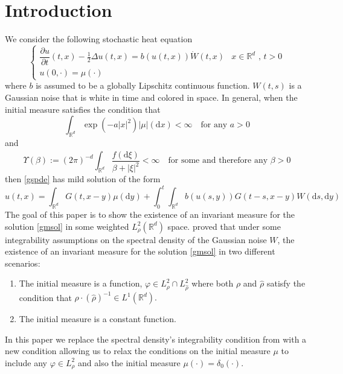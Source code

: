 \documentclass{article}
\numberwithin{equation}{section}
\newcommand{\R}{\mathbb{R}}
\newcommand{\ud}{\ensuremath{\mathrm{d}}}
\begin{document}
\section{Introduction} 
We consider the following stochastic heat equation 
\begin{equation}
\begin{cases}
\dfrac{\partial u}{\partial t}(t,x)-\frac{1}{2}\Delta u(t,x) = b(u(t,x))\dot W(t,x) & \text{$x\in \mathbb R^d$ , $t>0$}
\\ u(0,\cdot) = \mu(\cdot)  & 
\end{cases}  \label{gspde}
\end{equation} 
where $b$ is assumed to be a globally Lipschitz continuous function. $W(t,s)$  is a Gaussian noise that is white in time and colored in space. In general, when the initial measure satisfies the condition that \begin{equation} \int_{\R^d}\exp(-a|x|^2)|\mu|(\ud x) < \infty \quad \text{for any $a>0$} \label{icon} \end{equation} and \begin{equation} \Upsilon(\beta) := (2\pi)^{-d}\int_{\R^d}\dfrac{\hat f(\ud \xi)}{\beta + |\xi|^2} < \infty \quad \text{for some and therefore any $\beta>0$}  \label{dalcon} \end{equation} then \eqref{gspde} has mild solution of the form 
\begin{equation}
u(t,x)=\int_{\mathbb R^d}G(t,x-y)\mu(\ud y) + \int_0^t\int_{\mathbb R^d}b(u(s,y))G(t-s,x-y)W(\ud s,\ud y) \label{gmsol}
\end{equation}
The goal of this paper is to show the existence of an invariant measure for the solution \eqref{gmsol} in some weighted $L^2_\rho(\R^d)$ space. \cite{TessitoreZabczyk98M} proved that under some integrability assumptions on the spectral density of the Gaussian noise $W$, the existence of an invariant measure for the solution \eqref{gmsol} in two different scenarios:
\begin{enumerate}
	\item The initial measure is a function, $\varphi \in L^2_\rho \cap L^2_{\hat\rho}$ where both $\rho$ and $\hat\rho$ satisfy the condition that $\rho \cdot (\hat\rho)^{-1} \in L^1(\R^d).$ 
	\item The initial measure is a constant function. 
\end{enumerate} 
In this paper we replace the spectral density's integrability condition from \cite{TessitoreZabczyk98M} with a new condition allowing us to relax the conditions on the initial measure $\mu$ to include any $\varphi \in L^2_\rho$ and also the initial measure $\mu(\cdot)=\delta_0(\cdot)$. 
\end{document}
